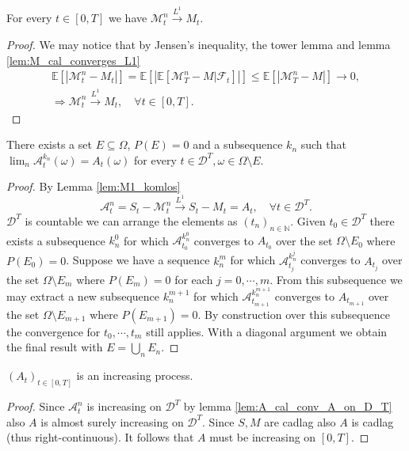 \begin{lemma}\label{lem:M1_komlos}
  For every $t\in[0,T]$ we have $\mathcal{M}^n_t\stackrel{L^1}{\rightarrow}M_t$.
\end{lemma}
\begin{proof}
  We may notice that by Jensen's inequality, the tower lemma and lemma \ref{lem:M_cal_converges_L1}
  \begin{gather}\nonumber
    \mathbb{E}[|\mathcal{M}^n_t-M_t|]=\mathbb{E}[|\mathbb{E}[\mathcal{M}^n_T-M\vert\mathcal{F}_t]|]\leq \mathbb{E}[|\mathcal{M}^n_T-M|]\rightarrow0,\\
    \Rightarrow\mathcal{M}^n_t\stackrel{L^1}{\rightarrow} M_t,\quad \forall t\in[0,T].\label{equation_DM_e7}
  \end{gather}
\end{proof}

\begin{lemma}\label{lem:A_cal_conv_A_on_D_T}
  There exists a set $E\subseteq\Omega$, $P(E)=0$ and a subsequence $k_n$ such that $\lim_n\mathcal{A}^{k_n}_t(\omega)=A_t(\omega)$ for every $t\in\mathcal{D}^T,\omega\in\Omega\setminus E$.
\end{lemma}
\begin{proof}
  By Lemma \ref{lem:M1_komlos}
  $$
  \mathcal{A}^n_t=S_t-\mathcal{M}^n_t\stackrel{L^1}{\rightarrow}S_t-M_t=A_t,\quad\forall t\in\mathcal{D}^T.
  $$
  $\mathcal{D}^T$ is countable we can arrange the elements as $(t_n)_{n\in\mathbb{N}}$.
  Given $t_0\in\mathcal{D}^T$ there exists a subsequence $k^{0}_n$ for which $\mathcal{A}^{k^{0}_n}_{t_0}$ converges to $A_{t_0}$ over the set $\Omega\setminus E_{0}$ where $P(E_{0})=0$.
  Suppose we have a sequence $k^m_n$ for which $\mathcal{A}^{k^j_n}_{t_j}$ converges to $A_{t_j}$ over the set $\Omega\setminus E_{m}$ where $P(E_{m})=0$ for each $j=0,\cdots,m$.
  From this subsequence we may extract a new subsequence $k^{m+1}_n$ for which $\mathcal{A}^{k^{m+1}_n}_{t_{m+1}}$ converges to $A_{t_{m+1}}$ over the set $\Omega\setminus E_{m+1}$ where $P(E_{m+1})=0$.
  By construction over this subsequence the convergence for $t_0,\cdots,t_m$ still applies.
  With a diagonal argument we obtain the final result with $E=\bigcup_n E_n$.
\end{proof}

\begin{lemma}\label{lem:A_increasing}
  $(A_t)_{t\in[0,T]}$ is an increasing process.
\end{lemma}
\begin{proof}
  Since $\mathcal{A}^n_t$ is increasing on $\mathcal{D}^T$ by lemma \ref{lem:A_cal_conv_A_on_D_T} also $A$ is almost surely increasing on $\mathcal{D}^T$.
  Since $S,M$ are cadlag also $A$ is cadlag (thus right-continuous). It follows that $A$ must be increasing on $[0,T]$.
\end{proof}

